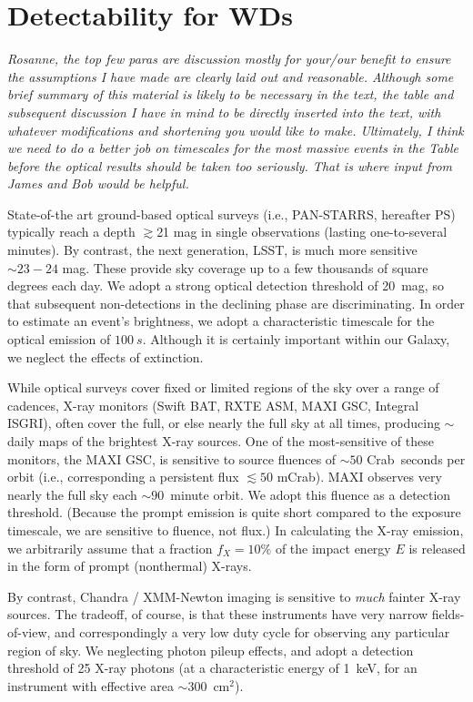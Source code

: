 \section{Detectability for WDs}
{\it Rosanne, the top few paras are discussion mostly for your/our benefit to ensure the assumptions I have made are clearly laid out and reasonable.  Although some brief summary of this material is likely to be necessary in the text, the table and subsequent discussion I have in mind to be directly inserted into the text, with whatever modifications and shortening you would like to make.  Ultimately, I think we need to do a better job on timescales for the most massive events in the Table before the optical results should be taken too seriously. That is where input from James and Bob would be helpful.}


State-of-the art ground-based optical surveys (i.e., PAN-STARRS, hereafter PS) typically reach a depth $\gtrsim$21 mag in single observations (lasting one-to-several minutes).  By contrast, the next generation, LSST, is much more sensitive $\sim 23-24$ mag.   These provide sky coverage up to a few thousands of square degrees each day.  We adopt a strong optical detection threshold of 20~mag, so that subsequent non-detections in the declining phase are discriminating.  In order to estimate an event's brightness, we adopt a characteristic timescale for the optical emission of $100~s$.  Although it is certainly important within our Galaxy, we neglect the effects of extinction. 


While optical surveys cover fixed or limited regions of the sky over a range of cadences, X-ray monitors (Swift BAT, RXTE ASM, MAXI GSC, Integral ISGRI), often cover the full, or else nearly the full sky at all times, producing $\sim$daily maps of the brightest X-ray sources.   One of the most-sensitive of these monitors, the MAXI GSC, is sensitive to source fluences of $\sim50$ Crab~seconds per orbit (i.e., corresponding a persistent flux $\lesssim 50$ mCrab).  MAXI observes very nearly the full sky each $\sim 90$~minute orbit.   We adopt this fluence as a detection threshold.  (Because the prompt emission is quite short compared to the exposure timescale, we are sensitive to fluence, not flux.)  In calculating the X-ray emission, we arbitrarily assume that a fraction $f_X = 10\%$ of the impact energy $E$ is released in the form of prompt (nonthermal) X-rays.  


By contrast, Chandra / XMM-Newton imaging is sensitive to {\em much} fainter X-ray sources.  The tradeoff, of course, is that these instruments have very narrow fields-of-view, and correspondingly a very low duty cycle for observing any particular region of sky.  We neglecting photon pileup effects, and adopt a detection threshold of 25 X-ray photons (at a characteristic energy of 1~keV, for an instrument with effective area $\sim300$~cm$^2$).   


